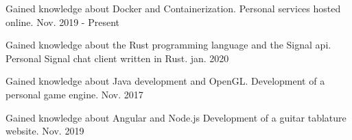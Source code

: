 

\begin{cventries}

  \cventry
    {Gained knowledge about Docker and Containerization.} %
    {Personal services hosted online.} %
    {} %
    {Nov. 2019 - Present} %

  \cventry
    {Gained knowledge about the Rust programming language and the Signal api.} %
    {Personal Signal chat client written in Rust.} %
    {} %
    {jan. 2020} %

  \cventry
    {Gained knowledge about Java development and OpenGL.} %
    {Development of a personal game engine.} %
    {} %
    {Nov. 2017} %

  \cventry
    {Gained knowledge about Angular and Node.js} %
    {Development of a guitar tablature website.} %
    {} %
    {Nov. 2019} %

\end{cventries}
